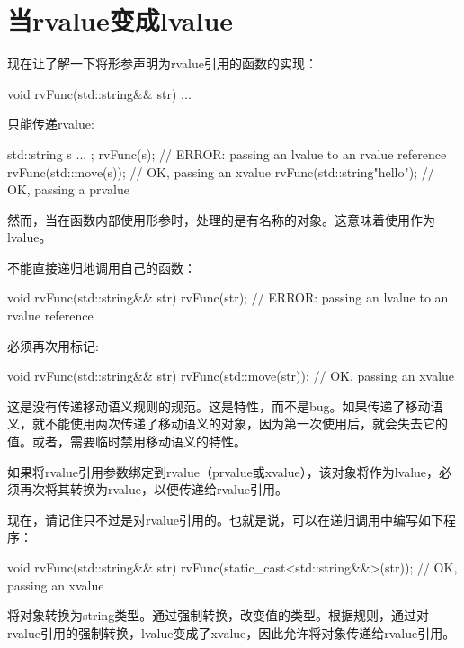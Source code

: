 \section{当rvalue变成lvalue}
现在让了解一下将形参声明为rvalue引用的函数的实现：

\begin{cppcode}
void rvFunc(std::string&& str) {
	...
}
\end{cppcode}

只能传递rvalue:

\begin{cppcode}
std::string s{ ... };
rvFunc(s); // ERROR: passing an lvalue to an rvalue reference
rvFunc(std::move(s)); // OK, passing an xvalue
rvFunc(std::string{"hello"}); // OK, passing a prvalue
\end{cppcode}

然而，当在函数内部使用形参时，处理的是有名称的对象。这意味着使用作为lvalue。

不能直接递归地调用自己的函数：

\begin{cppcode}
void rvFunc(std::string&& str) {
	rvFunc(str); // ERROR: passing an lvalue to an rvalue reference
}
\end{cppcode}

必须再次用标记:

\begin{cppcode}
void rvFunc(std::string&& str) {
	rvFunc(std::move(str)); // OK, passing an xvalue
}
\end{cppcode}

这是没有传递移动语义规则的规范。这是特性，而不是bug。如果传递了移动语义，就不能使用两次传递了移动语义的对象，因为第一次使用后，就会失去它的值。或者，需要临时禁用移动语义的特性。

如果将rvalue引用参数绑定到rvalue（prvalue或xvalue），该对象将作为lvalue，必须再次将其转换为rvalue，以便传递给rvalue引用。

现在，请记住只不过是对rvalue引用的。也就是说，可以在递归调用中编写如下程序：

\begin{cppcode}
void rvFunc(std::string&& str) {
	rvFunc(static_cast<std::string&&>(str)); // OK, passing an xvalue
}
\end{cppcode}

将对象转换为string类型。通过强制转换，改变值的类型。根据规则，通过对rvalue引用的强制转换，lvalue变成了xvalue，因此允许将对象传递给rvalue引用。

